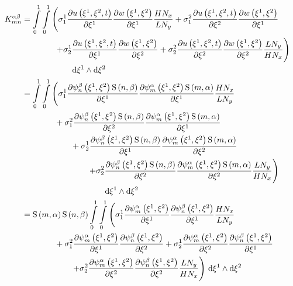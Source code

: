 \begin{equation}
  \begin{aligned}
    K^{\alpha\beta}_{mn}&= \displaystyle\int\limits_{0}^{1}  \displaystyle\int\limits_{0}^{1} \left( \sigma ^{1}_{1} \dfrac{\partial  u\left( \xi^{1},\xi^{2},t \right) }{\partial \xi^{1}} 
     \dfrac{\partial  w\left( \xi^{1},\xi^{2} \right) }{\partial \xi^{1}} \dfrac{H N_{x}}{L N_{y}}+
     \sigma ^{2}_{1} \dfrac{\partial  u\left( \xi^{1},\xi^{2},t \right) }{\partial \xi^{2}}  \dfrac{\partial  w\left( \xi^{1},\xi^{2} \right) }{\partial \xi^{1}} 
    \right.\\
    &\qquad\qquad\left.+ \sigma ^{1}_{2} \dfrac{\partial  u\left( \xi^{1},\xi^{2},t \right) }{\partial \xi^{1}} 
     \dfrac{\partial  w\left( \xi^{1},\xi^{2} \right) }{\partial \xi^{2}} +
     \sigma ^{2}_{2} \dfrac{\partial  u\left( \xi^{1},\xi^{2},t \right) }{\partial \xi^{2}} 
     \dfrac{\partial  w\left( \xi^{1},\xi^{2} \right) }{\partial \xi^{2}} \dfrac{L N_{y}}{H N_{x}}\right)\\
    &\qquad\qquad\qquad \,   \mathrm{d}   \xi^{1} \wedge   \mathrm{d}   \xi^{2}   \\
    &= \displaystyle\int\limits_{0}^{1}  \displaystyle\int\limits_{0}^{1} \left( \sigma ^{1}_{1} \dfrac{\partial    \psi_{n}^{\beta} \left( \xi^{1},\xi^{2} \right)     \mathrm{S} \left( n,\beta \right)  }{\partial \xi^{1}} 
     \dfrac{\partial    \psi_{m}^{\alpha} \left( \xi^{1},\xi^{2} \right)     \mathrm{S} \left( m,\alpha \right)  }{\partial \xi^{1}} \dfrac{H N_{x}}{L N_{y}}\right.\\
    &\qquad\qquad+ \sigma ^{2}_{1} \dfrac{\partial    \psi_{n}^{\beta} \left( \xi^{1},\xi^{2} \right)     \mathrm{S} \left( n,\beta \right)  }{\partial \xi^{2}} 
     \dfrac{\partial    \psi_{m}^{\alpha} \left( \xi^{1},\xi^{2} \right)     \mathrm{S} \left( m,\alpha \right)  }{\partial \xi^{1}} \\
    &\qquad\qquad\qquad+ \sigma ^{1}_{2} \dfrac{\partial    \psi_{n}^{\beta} \left( \xi^{1},\xi^{2} \right)     \mathrm{S} \left( n,\beta \right)  }{\partial \xi^{1}} 
     \dfrac{\partial    \psi_{m}^{\alpha} \left( \xi^{1},\xi^{2} \right)     \mathrm{S} \left( m,\alpha \right)  }{\partial \xi^{2}} \\
    &\qquad\qquad\qquad\qquad\left.+ \sigma ^{2}_{2} \dfrac{\partial    \psi_{n}^{\beta} \left( \xi^{1},\xi^{2} \right)     \mathrm{S} \left( n,\beta \right)  }{\partial \xi^{2}} 
     \dfrac{\partial    \psi_{m}^{\alpha} \left( \xi^{1},\xi^{2} \right)     \mathrm{S} \left( m,\alpha \right)  }{\partial \xi^{2}} \dfrac{L N_{y}}{H N_{x}}\right)\\
    &\qquad\qquad\qquad\qquad\qquad \,   \mathrm{d}   \xi^{1} \wedge   \mathrm{d}   \xi^{2}  \\
    &=   \mathrm{S} \left( m,\alpha \right)     \mathrm{S} \left( n,\beta \right)   \displaystyle\int\limits_{0}^{1}  \displaystyle\int\limits_{0}^{1} \left(
     \sigma ^{1}_{1} \dfrac{\partial    \psi_{m}^{\alpha} \left( \xi^{1},\xi^{2} \right)  }{\partial \xi^{1}} 
     \dfrac{\partial    \psi_{n}^{\beta} \left( \xi^{1},\xi^{2} \right)  }{\partial \xi^{1}} \dfrac{H N_{x}}{L N_{y}}\right.\\
    &\qquad\qquad+ \sigma ^{2}_{1} \dfrac{\partial    \psi_{m}^{\alpha} \left( \xi^{1},\xi^{2} \right)  }{\partial \xi^{1}} 
     \dfrac{\partial    \psi_{n}^{\beta} \left( \xi^{1},\xi^{2} \right)  }{\partial \xi^{2}} + \sigma ^{1}_{2} \dfrac{\partial    \psi_{m}^{\alpha} \left( \xi^{1},\xi^{2} \right)  }{\partial \xi^{2}} 
     \dfrac{\partial    \psi_{n}^{\beta} \left( \xi^{1},\xi^{2} \right)  }{\partial \xi^{1}} \\
    &\qquad\qquad\qquad\left.+ \sigma ^{2}_{2} \dfrac{\partial    \psi_{m}^{\alpha} \left( \xi^{1},\xi^{2} \right)  }{\partial \xi^{2}} 
     \dfrac{\partial    \psi_{n}^{\beta} \left( \xi^{1},\xi^{2} \right)  }{\partial \xi^{2}} \dfrac{L N_{y}}{H N_{x}}\right) \,   \mathrm{d}   \xi^{1} \wedge   \mathrm{d}   \xi^{2}  
  \end{aligned}
\end{equation}

